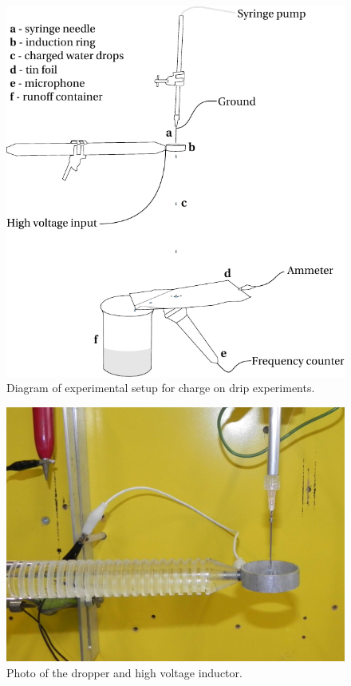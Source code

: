     \begin{figure}[ht]
        \centering
        \includegraphics[scale=0.9]{content/appendices/chargedWaterDrops/graphics/ChargedDrips_Figure_Drawing_ExperimentalSetup}
        \caption{\label{ChargedDrips_Figure_Drawing_ExperimentalSetup}Diagram of experimental setup for charge on drip experiments.}
    \end{figure}

    \begin{figure}[ht]
        \centering
        \includegraphics[scale=0.12]{content/appendices/chargedWaterDrops/graphics/Photo_dripperExperiment_Inductor_draft.JPG}
        \caption{Photo of the dropper and high voltage inductor.}
        \label{Photo_dripperExperiment_Inductor}
    \end{figure}

